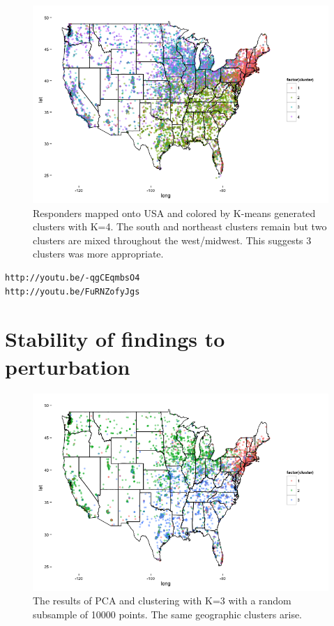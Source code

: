 \documentclass[english]{article}\usepackage{graphicx, color}
\numberwithin{equation}{section}
\numberwithin{figure}{section}
\begin{document}
\begin{figure}
\begin{center}
\includegraphics[scale=.5]{pcamap4clusters.png}
\end{center}
\caption{Responders mapped onto USA and colored by K-means generated clusters with K=4. The south and northeast clusters remain but two clusters are mixed throughout the west/midwest. This suggests 3 clusters was more appropriate.}
\end{figure}


\begin{verbatim}
http://youtu.be/-qgCEqmbsO4
http://youtu.be/FuRNZofyJgs
\end{verbatim}



\section{Stability of findings to perturbation}

\begin{figure}
\begin{center}
\includegraphics[scale=.5]{pcasubsample.png}
\end{center}
\caption{The results of PCA and clustering with K=3 with a random subsample of 10000 points. The same geographic clusters arise.}
\end{figure}
\end{document}

